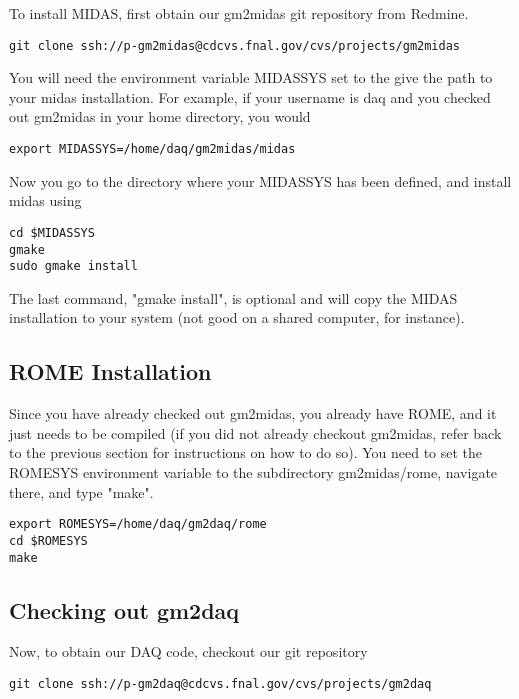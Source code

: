 To install MIDAS, first obtain our gm2midas git repository from Redmine.

\begin{verbatim}
git clone ssh://p-gm2midas@cdcvs.fnal.gov/cvs/projects/gm2midas
\end{verbatim}

You will need the environment variable MIDASSYS set to the give the path to your midas installation. For example, if your username is daq and you checked out gm2midas in your home directory, you would

\begin{verbatim}
export MIDASSYS=/home/daq/gm2midas/midas
\end{verbatim}

Now you go to the directory where your MIDASSYS has been defined, and install midas using

\begin{verbatim}
cd $MIDASSYS
gmake
sudo gmake install
\end{verbatim}

The last command, "gmake install", is optional and will copy the MIDAS installation to your system (not good on a shared computer, for instance). 

\subsection{ROME Installation}

Since you have already checked out gm2midas, you already have ROME, and it just needs to be compiled (if you did not already checkout gm2midas, refer back to the previous section for instructions on how to do so). You need to set the ROMESYS environment variable to the subdirectory gm2midas/rome, navigate there, and type "make". 

\begin{verbatim}
export ROMESYS=/home/daq/gm2daq/rome
cd $ROMESYS
make
\end{verbatim}

\subsection{Checking out gm2daq}

Now, to obtain our DAQ code, checkout our git repository

\begin{verbatim}
git clone ssh://p-gm2daq@cdcvs.fnal.gov/cvs/projects/gm2daq
\end{verbatim}

